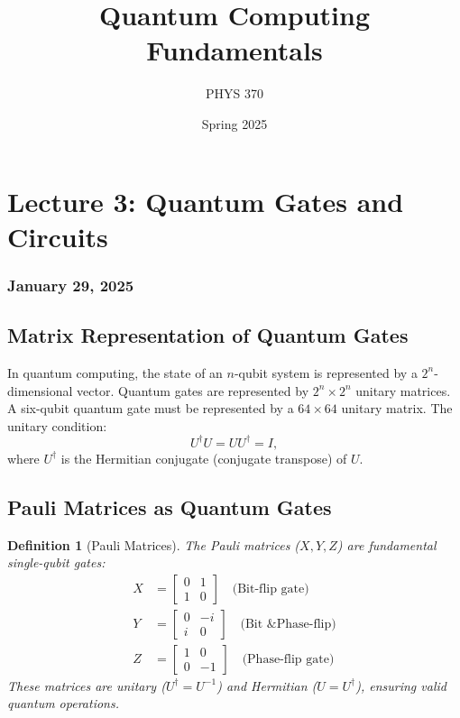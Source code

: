 \documentclass{article}
\title{Quantum Computing Fundamentals}
\author{PHYS 370}
\date{Spring 2025}
\newtheorem{definition}[theorem]{Definition}
\begin{document}
\maketitle

\newpage
\tableofcontents
\newpage

\section{Lecture 3: Quantum Gates and Circuits}
\subsubsection*{January 29, 2025}

\subsection{Matrix Representation of Quantum Gates}
\begin{conceptbox}
In quantum computing, the state of an \(n\)-qubit system is represented by a \(2^n\)-dimensional vector. Quantum gates are represented by \(2^n \times 2^n\) unitary matrices. A six-qubit quantum gate must be represented by a \(64 \times 64\) unitary matrix. The unitary condition:
\[
U^{\dagger}U = U U^{\dagger} = I,
\]
where \(U^{\dagger}\) is the Hermitian conjugate (conjugate transpose) of \(U\).
\end{conceptbox}

\subsection{Pauli Matrices as Quantum Gates}
\begin{definition}[Pauli Matrices]
The Pauli matrices (\(X, Y, Z\)) are fundamental single-qubit gates:
\begin{align*}
X & = \begin{bmatrix} 0 & 1 \\ 1 & 0 \end{bmatrix} \quad \text{(Bit-flip gate)} \\
Y & = \begin{bmatrix} 0 & -i \\ i & 0 \end{bmatrix} \quad \text{(Bit \& Phase-flip)} \\
Z & = \begin{bmatrix} 1 & 0 \\ 0 & -1 \end{bmatrix} \quad \text{(Phase-flip gate)}
\end{align*}
These matrices are unitary (\(U^{\dagger} = U^{-1}\)) and Hermitian (\(U = U^{\dagger}\)), ensuring valid quantum operations.
\end{definition}
\end{document}
